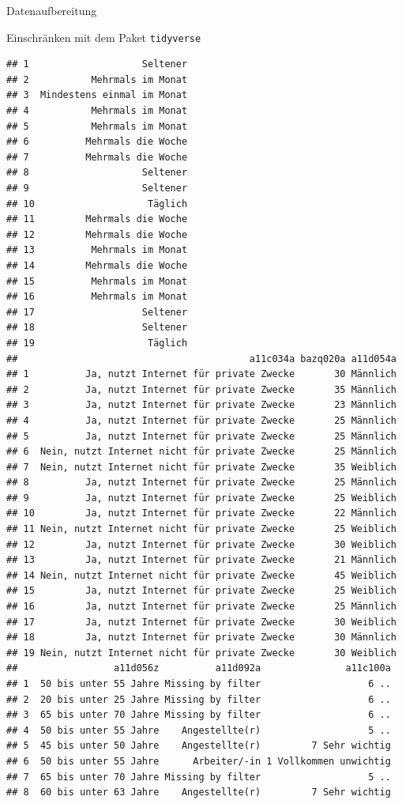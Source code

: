 \documentclass[ignorenonframetext,]{beamer}
\begin{document}
\begin{frame}[fragile]{Datenaufbereitung}
\begin{block}{Einschränken mit dem Paket \texttt{tidyverse}}
\begin{verbatim}
## 1                    Seltener
## 2           Mehrmals im Monat
## 3  Mindestens einmal im Monat
## 4           Mehrmals im Monat
## 5           Mehrmals im Monat
## 6          Mehrmals die Woche
## 7          Mehrmals die Woche
## 8                    Seltener
## 9                    Seltener
## 10                    Täglich
## 11         Mehrmals die Woche
## 12         Mehrmals die Woche
## 13          Mehrmals im Monat
## 14         Mehrmals die Woche
## 15          Mehrmals im Monat
## 16          Mehrmals im Monat
## 17                   Seltener
## 18                   Seltener
## 19                    Täglich
##                                         a11c034a bazq020a a11d054a
## 1          Ja, nutzt Internet für private Zwecke       30 Männlich
## 2          Ja, nutzt Internet für private Zwecke       35 Männlich
## 3          Ja, nutzt Internet für private Zwecke       23 Männlich
## 4          Ja, nutzt Internet für private Zwecke       25 Männlich
## 5          Ja, nutzt Internet für private Zwecke       25 Männlich
## 6  Nein, nutzt Internet nicht für private Zwecke       25 Männlich
## 7  Nein, nutzt Internet nicht für private Zwecke       35 Weiblich
## 8          Ja, nutzt Internet für private Zwecke       25 Männlich
## 9          Ja, nutzt Internet für private Zwecke       25 Weiblich
## 10         Ja, nutzt Internet für private Zwecke       22 Männlich
## 11 Nein, nutzt Internet nicht für private Zwecke       25 Weiblich
## 12         Ja, nutzt Internet für private Zwecke       30 Weiblich
## 13         Ja, nutzt Internet für private Zwecke       21 Männlich
## 14 Nein, nutzt Internet nicht für private Zwecke       45 Weiblich
## 15         Ja, nutzt Internet für private Zwecke       25 Weiblich
## 16         Ja, nutzt Internet für private Zwecke       25 Männlich
## 17         Ja, nutzt Internet für private Zwecke       30 Weiblich
## 18         Ja, nutzt Internet für private Zwecke       30 Männlich
## 19 Nein, nutzt Internet nicht für private Zwecke       30 Weiblich
##                 a11d056z          a11d092a               a11c100a
## 1  50 bis unter 55 Jahre Missing by filter                   6 ..
## 2  20 bis unter 25 Jahre Missing by filter                   6 ..
## 3  65 bis unter 70 Jahre Missing by filter                   6 ..
## 4  50 bis unter 55 Jahre    Angestellte(r)                   5 ..
## 5  45 bis unter 50 Jahre    Angestellte(r)         7 Sehr wichtig
## 6  50 bis unter 55 Jahre      Arbeiter/-in 1 Vollkommen unwichtig
## 7  65 bis unter 70 Jahre Missing by filter                   5 ..
## 8  60 bis unter 63 Jahre    Angestellte(r)         7 Sehr wichtig

\end{verbatim}
\end{block}
\end{frame}
\end{document}
